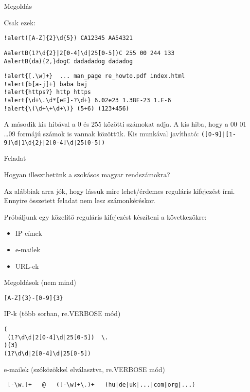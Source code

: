 \documentclass[
    ignorenonframetext
    ]{beamer}
\begin{document}
\begin{frame}
    [fragile]{Megoldás}

    Csak ezek:

\begin{Verbatim}[commandchars=!()]
!alert([A-Z]{2}\d{5}) CA12345 AA54321
\end{Verbatim}
\begin{Verbatim}[commandchars=ABC]
AalertB(1?\d{2}|2[0-4]\d|25[0-5])C 255 00 244 133
AalertB(da){2,}dogC dadadadog dadadog
\end{Verbatim}
\begin{Verbatim}[commandchars=!\{\}]
!alert{[.\w]+}  ... man_page re_howto.pdf index.html
!alert{b[a-j]+} baba baj
!alert{https?} http https
!alert{\d+\.\d*[eE]-?\d+} 6.02e23 1.38E-23 1.E-6
!alert{\(\d+\+\d+\)} (5+6) (123+456)
\end{Verbatim}

A második kis hibával a 0 és 255 közötti számokat adja. A kis hiba, hogy
a 00 01 \ldots 09 formájú számok is vannak közöttük. Kis munkával
javítható: \verb!([0-9]|[1-9]\d|1\d{2}|2[0-4]\d|25[0-5])!
\end{frame}

\begin{frame}
    {Feladat}

    Hogyan illeszthetünk a szokásos magyar rendszámokra?

    \vfill
    Az alábbiak arra jók, hogy lássuk mire lehet/érdemes reguláris
    kifejezést írni. Ennyire összetett feladat nem lesz számonkéréskor.

    \vfill
    Próbáljunk egy közelítő reguláris kifejezést készíteni a
    következőkre:
    \begin{itemize}
        \item IP-címek
        \item e-mailek
        \item URL-ek
    \end{itemize}

    \megoldasjon
\end{frame}

\begin{frame}[fragile]
    {Megoldások (nem mind)}

    \verb"[A-Z]{3}-[0-9]{3}"

\vfill
IP-k (több sorban, re.VERBOSE mód)
\begin{verbatim}
(
 (1?\d\d|2[0-4]\d|25[0-5])  \.
){3}
(1?\d\d|2[0-4]\d|25[0-5])
\end{verbatim}

\vfill
e-mailek (szóközökkel elválasztva, re.VERBOSE mód)
\begin{verbatim}
 [-\w.]+   @   ([-\w]+\.)+   (hu|de|uk|...|com|org|...)
\end{verbatim}
\end{frame}
\end{document}
